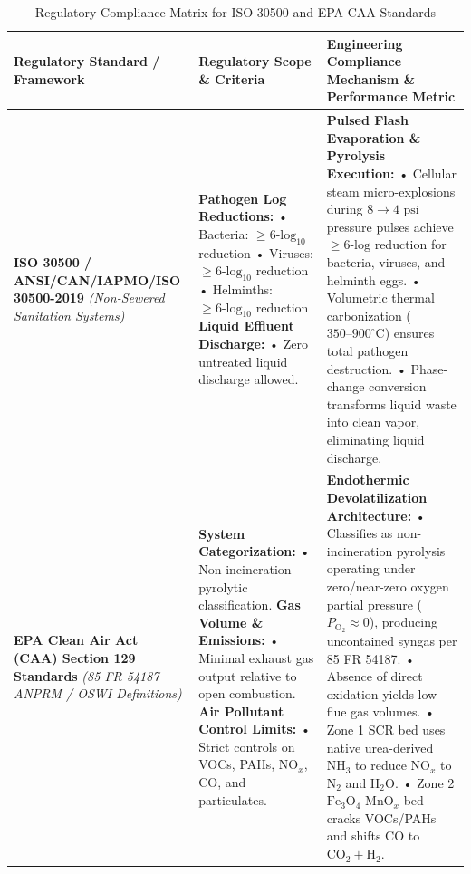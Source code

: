 \documentclass[10pt,twocolumn,a4paper]{article}
\begin{document}
\begin{table}[t]
\centering
\caption{Regulatory Compliance Matrix for ISO 30500 and EPA CAA Standards}
\label{tab:regulatory_matrix}
\begin{tabular}{p{4.5cm} p{5.0cm} p{6.5cm}}
\toprule
\textbf{Regulatory Standard / Framework} & \textbf{Regulatory Scope \& Criteria} & \textbf{Engineering Compliance Mechanism \& Performance Metric} \\
\midrule
\textbf{ISO 30500 / ANSI/CAN/IAPMO/ISO 30500-2019} \textit{(Non-Sewered Sanitation Systems)} &
\textbf{Pathogen Log Reductions:} \newline
• Bacteria: $\ge 6\text{-log}_{10}$ reduction \newline
• Viruses: $\ge 6\text{-log}_{10}$ reduction \newline
• Helminths: $\ge 6\text{-log}_{10}$ reduction \newline\newline
\textbf{Liquid Effluent Discharge:} \newline
• Zero untreated liquid discharge allowed. &
\textbf{Pulsed Flash Evaporation \& Pyrolysis Execution:} \newline
• Cellular steam micro-explosions during $8 \rightarrow 4\text{ psi}$ pressure pulses achieve $\ge 6\text{-log}$ reduction for bacteria, viruses, and helminth eggs. \newline
• Volumetric thermal carbonization ($350\text{--}900^\circ\text{C}$) ensures total pathogen destruction. \newline
• Phase-change conversion transforms liquid waste into clean vapor, eliminating liquid discharge. \\
\midrule
\textbf{EPA Clean Air Act (CAA) Section 129 Standards} \textit{(85 FR 54187 ANPRM / OSWI Definitions)} &
\textbf{System Categorization:} \newline
• Non-incineration pyrolytic classification. \newline\newline
\textbf{Gas Volume \& Emissions:} \newline
• Minimal exhaust gas output relative to open combustion. \newline\newline
\textbf{Air Pollutant Control Limits:} \newline
• Strict controls on VOCs, PAHs, $\text{NO}_x$, $\text{CO}$, and particulates. &
\textbf{Endothermic Devolatilization Architecture:} \newline
• Classifies as non-incineration pyrolysis operating under zero/near-zero oxygen partial pressure ($P_{\text{O}_2} \approx 0$), producing uncontained syngas per 85 FR 54187. \newline
• Absence of direct oxidation yields low flue gas volumes. \newline
• Zone 1 SCR bed uses native urea-derived $\text{NH}_3$ to reduce $\text{NO}_x$ to $\text{N}_2$ and $\text{H}_2\text{O}$. \newline
• Zone 2 $\text{Fe}_3\text{O}_4\text{-MnO}_x$ bed cracks VOCs/PAHs and shifts $\text{CO}$ to $\text{CO}_2 + \text{H}_2$. \\
\bottomrule
\end{tabular}
\end{table}
\end{document}

